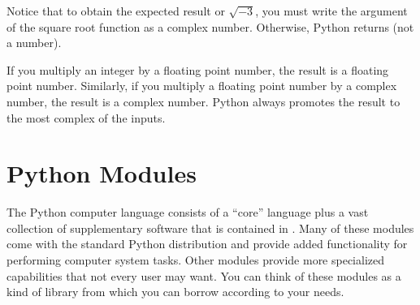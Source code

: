\documentclass[letterpaper,10pt,english]{sphinxmanual}
\begin{document}
\begin{sphinxVerbatim}[commandchars=\\\{\},numbers=left,firstnumber=1,stepnumber=1]



\end{sphinxVerbatim}

\sphinxAtStartPar
Notice that to obtain the expected result or \(\sqrt{-3}\), you must write the argument of the square root function as a complex number.  Otherwise, Python returns  (not a number).

\sphinxAtStartPar
If you multiply an integer by a floating point number, the result is a floating point number.  Similarly, if you multiply a floating point number by a complex number, the result is a complex number.  Python always promotes the result to the most complex of the inputs.

\ignorespaces 

\section{Python Modules}
\label{\detokenize{chap2/chap2_basics:python-modules}}\label{\detokenize{chap2/chap2_basics:index-10}}
\sphinxAtStartPar
The Python computer language consists of a “core” language plus a vast collection of supplementary software that is contained in .  Many of these modules come with the standard Python distribution and provide added functionality for performing computer system tasks.  Other modules provide more specialized capabilities that not every user may want.  You can think of these modules as a kind of library from which you can borrow according to your needs.
\end{document}
